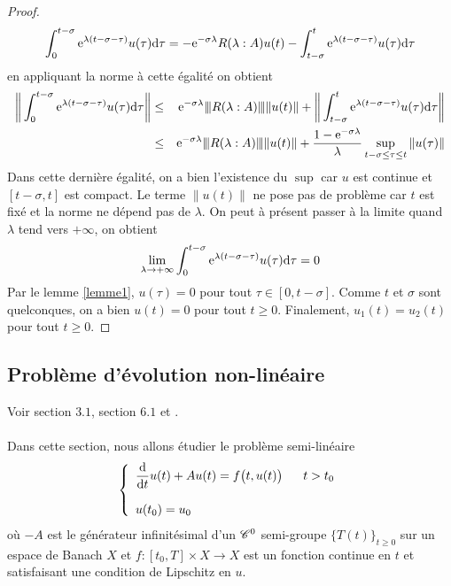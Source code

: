 \begin{proof}
    \begin{equation*}
        \int_0^{t-\sigma}\mathrm{e}^{\lambda(t-\sigma-\tau)}u(\tau)\mathrm{d}\tau = -\mathrm{e}^{-\sigma \lambda}R(\lambda : A)u(t)-\int_{t-\sigma}^t \mathrm{e}^{\lambda (t-\sigma-\tau)}u(\tau)\mathrm{d}\tau
    \end{equation*}
    en appliquant la norme à cette égalité on obtient 
    \begin{eqnarray*}
        \bigg\|\int_0^{t-\sigma}\mathrm{e}^{\lambda(t-\sigma-\tau)}u(\tau)\mathrm{d}\tau\bigg\| &\leq& \mathrm{e}^{-\sigma \lambda}{\left\vert\kern-0.25ex\left\vert \kern-0.25ex\left\vert R(\lambda:A) \right\vert\kern-0.25ex\right\vert\kern-0.25ex\right\vert}\|u(t)\| + \bigg\|\int_{t-\sigma}^t \mathrm{e}^{\lambda (t-\sigma-\tau)}u(\tau)\mathrm{d}\tau\bigg\| \\
        &\leq& \mathrm{e}^{-\sigma \lambda}{\left\vert\kern-0.25ex\left\vert \kern-0.25ex\left\vert R(\lambda:A) \right\vert\kern-0.25ex\right\vert\kern-0.25ex\right\vert}\|u(t)\| + \frac{1-\mathrm{e}^{-\sigma \lambda}}{\lambda}\sup_{t-\sigma \leq \tau \leq t}\|u(\tau)\| 
    \end{eqnarray*}
    Dans cette dernière égalité, on a bien l'existence du $\sup$ car $u$ est continue et $[t-\sigma,t]$ est compact. Le terme $\|u(t)\|$ ne pose pas de problème car $t$ est fixé et la norme ne dépend pas de $\lambda$. On peut à présent passer à la limite quand $\lambda$ tend vers $+\infty$, on obtient
    \begin{equation*}
        \lim_{\lambda \to +\infty}\int_0^{t-\sigma}\mathrm{e}^{\lambda(t-\sigma-\tau)}u(\tau)\mathrm{d}\tau=0
    \end{equation*}
    Par le lemme \ref{lemme1}, $u(\tau)=0$ pour tout $\tau \in [0,t-\sigma]$. Comme $t$ et $\sigma$ sont quelconques, on a bien $u(t)=0$ pour tout $t \geq 0$. Finalement, $u_1(t)=u_2(t)$ pour tout $t \geq 0$.
\end{proof}

\subsection{Problème d'évolution non-linéaire}
Voir \cite{Pazy1983} section $3.1$, section $6.1$ et \cite[p.~199, p.~202, p.~206]{Webb1985}.
\\\\
Dans cette section, nous allons étudier le problème semi-linéaire
\begin{equation}\label{pbmCauchy_semilineaire}
    \left\{\begin{array}{l}
        \dfrac{\mathrm{d}}{\mathrm{d} t}u(t) +Au(t)=f\big(t,u(t)\big) \ \ \ \ \ t >t_0 \\
        \\
        u(t_0) = u_0
    \end{array}\right.
\end{equation}
où $-A$ est le générateur infinitésimal d'un $\mathscr{C}^0$ semi-groupe $\big\{T(t)\big\}_{t \geq 0}$ sur un espace de Banach $X$ et $f:[t_0,T] \times X \rightarrow X$ est un fonction continue en $t$ et satisfaisant une condition de Lipschitz en $u$.

